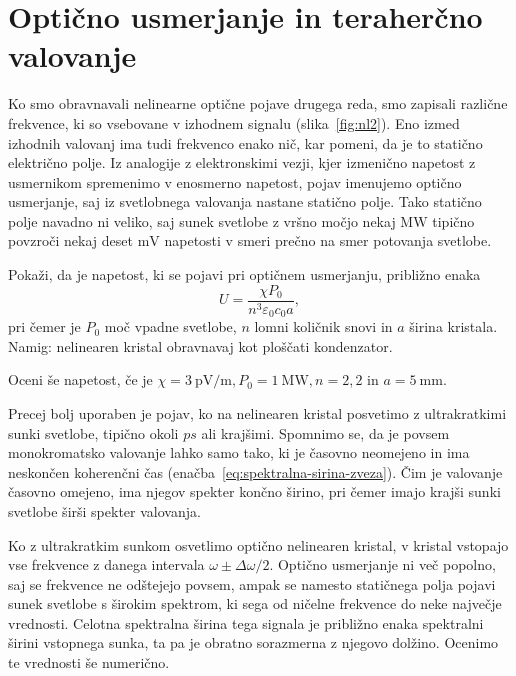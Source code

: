 \section{Optično usmerjanje in teraherčno valovanje}
Ko smo obravnavali nelinearne optične pojave drugega reda, smo zapisali
različne frekvence, ki so vsebovane v izhodnem signalu (slika~\ref{fig:nl2}). Eno izmed
izhodnih valovanj ima tudi frekvenco enako nič, kar pomeni, da je to statično električno polje. Iz analogije
z elektronskimi vezji, kjer izmenično napetost z usmernikom spremenimo v enosmerno napetost, 
pojav imenujemo optično usmerjanje, saj iz svetlobnega valovanja nastane statično polje. Tako statično 
polje navadno ni veliko, saj sunek svetlobe z vršno močjo nekaj $\si{\mega\watt}$ tipično povzroči 
nekaj deset $\si{\milli\volt}$ napetosti v smeri prečno na smer potovanja svetlobe. 

\begin{definition}
Pokaži, da je napetost, ki se pojavi pri optičnem usmerjanju, približno enaka
\begin{equation}
U = \frac{\chi P_0}{n^3 \varepsilon_0 c_0 a},
\end{equation}
pri čemer je $P_0$ moč vpadne svetlobe, $n$ lomni količnik snovi in $a$ širina kristala.\\
Namig: nelinearen kristal obravnavaj kot ploščati kondenzator. 

Oceni še napetost, če je
$\chi = 3~\si{\pico\volt/\meter}, P_0 = 1~\si{\mega\watt}, n = 2,2$ in $a = 5~\si{\milli\metre}$. 
\end{definition}

Precej bolj uporaben je pojav, ko na nelinearen kristal posvetimo z ultrakratkimi 
sunki svetlobe, tipično okoli $\si{ps}$ ali krajšimi. Spomnimo se, da je povsem 
monokromatsko valovanje lahko samo tako, ki je časovno neomejeno in ima neskončen koherenčni čas
(enačba~\ref{eq:spektralna-sirina-zveza}). 
Čim je valovanje časovno omejeno, ima njegov spekter končno širino, pri čemer 
imajo krajši sunki svetlobe širši spekter valovanja. 

Ko z ultrakratkim sunkom osvetlimo optično 
nelinearen kristal, v kristal vstopajo vse frekvence z danega intervala $\omega \pm \Delta \omega/2$.
Optično usmerjanje ni več popolno, saj se frekvence ne odštejejo povsem, ampak se 
namesto statičnega polja pojavi sunek svetlobe s širokim spektrom, ki sega od ničelne
frekvence do neke največje vrednosti. Celotna spektralna širina tega signala je 
približno enaka spektralni širini vstopnega sunka, ta pa je obratno sorazmerna z njegovo dolžino.
Ocenimo te vrednosti še numerično. 

